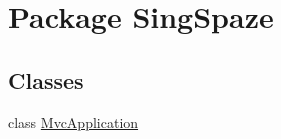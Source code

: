 \hypertarget{namespace_sing_spaze}{\section{Package Sing\+Spaze}
\label{namespace_sing_spaze}
}
\subsection*{Classes}
\begin{DoxyCompactItemize}
\item 
class \hyperlink{class_sing_spaze_1_1_mvc_application}{Mvc\+Application}
\end{DoxyCompactItemize}
